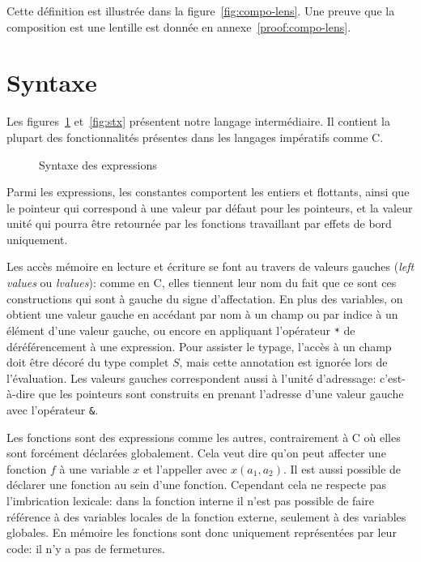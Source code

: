 Cette définition est illustrée dans la figure~\ref{fig:compo-lens}. Une preuve
que la composition est une lentille est donnée en annexe~\ref{proof:compo-lens}.

\section{Syntaxe}

Les figures~\ref{fig:stx-data} et~\ref{fig:stx} présentent
notre langage intermédiaire. Il contient la plupart des fonctionnalités
présentes dans les langages impératifs comme C.

\begin{figure}%

  \figstxdata{}

  \caption{Syntaxe des expressions}
\label{fig:stx-data}
\end{figure}%

Parmi les expressions, les constantes comportent les entiers et flottants, ainsi
que le pointeur \eNull qui correspond à une valeur par défaut pour les
pointeurs, et la valeur unité \eUnit qui pourra être retournée par les fonctions
travaillant par effets de bord uniquement.

Les accès mémoire en lecture et écriture se font au travers de valeurs gauches
(\emph{left values} ou \emph{lvalues}): comme en C, elles tiennent leur nom du
fait que ce sont ces constructions qui sont à gauche du signe d'affectation. En plus
des variables, on obtient une valeur gauche en accédant par nom à un champ ou par
indice à un élément d'une valeur gauche, ou encore en appliquant l'opérateur
\texttt{*} de déréférencement à une expression. Pour assister le typage, l'accès
à un champ doit être décoré du type complet $S$, mais cette annotation est
ignorée lors de l'évaluation. Les valeurs gauches correspondent aussi à l'unité
d'adressage: c'est-à-dire que les pointeurs sont construits en prenant l'adresse
d'une valeur gauche avec l'opérateur \texttt{\&}.

Les fonctions sont des expressions comme les autres, contrairement à C où elles
sont forcément déclarées globalement. Cela veut dire qu'on peut affecter une
fonction $f$ à une variable $x$ et l'appeller avec $x(a_1, a_2)$. Il est aussi
possible de déclarer une fonction au sein d'une fonction. Cependant cela ne
respecte pas l'imbrication lexicale: dans la fonction interne il n'est pas
possible de faire référence à des variables locales de la fonction externe,
seulement à des variables globales. En mémoire les fonctions sont donc
uniquement représentées par leur code: il n'y a pas de fermetures.

